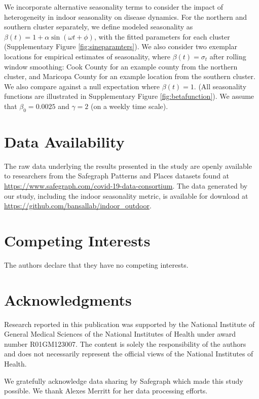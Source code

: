 \documentclass{article}
\begin{document}
We incorporate alternative seasonality terms to consider the impact of heterogeneity in indoor seasonality on disease dynamics. For the northern and southern cluster separately, we define modeled seasonality as $\beta(t) = 1 + \alpha \sin(\omega t + \phi)$, with the fitted parameters for each cluster (Supplementary Figure \ref{fig:sineparamters}). We also consider two exemplar locations for empirical estimates of seasonality, where $\beta(t) = \sigma_t$ after rolling window smoothing: Cook County for an example county from the northern cluster, and Maricopa County for an example location from the southern cluster. We also compare against a null expectation where $\beta(t) = 1$. (All seasonality functions are illustrated in Supplementary Figure \ref{fig:betafunction}). We assume that $\beta_0 = 0.0025$ and $\gamma = 2$ (on a weekly time scale).

\vspace{0.75in}
\hline
\vspace{0.25in}
\section*{Data Availability}
The raw data underlying the results presented in the study are openly available to researchers from the {Safegraph} {Patterns} and {Places} datasets found at \url{https://www.safegraph.com/covid-19-data-consortium}. The data generated by our study, including the indoor seasonality metric, is available for download at \url{https://github.com/bansallab/indoor_outdoor}.

\section*{Competing Interests}
The authors declare that they have no competing interests.

\section*{Acknowledgments}
Research reported in this publication was supported by the National Institute of General Medical Sciences of the National Institutes of Health under award number R01GM123007. The content is solely the responsibility of the authors and does not necessarily represent the official views of the National Institutes of Health.

We gratefully acknowledge data sharing by Safegraph which made this study possible. We thank Alexes Merritt for her data processing efforts.
\end{document}
